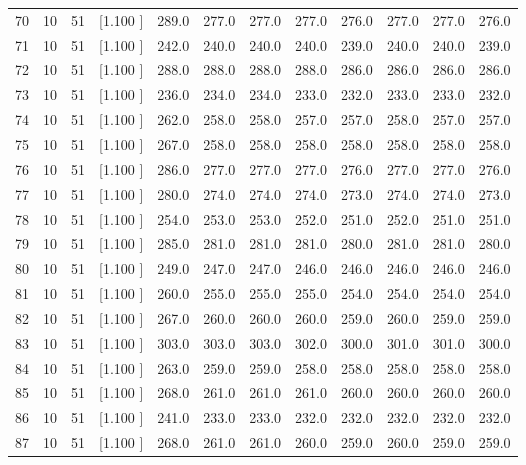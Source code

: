 \documentclass[12pt,a4paper]{article}
\begin{document}
\begin{center}
{\begin{tabular}{r r r r r r r r r r r r}
  70& 10& 51&[1.100     ]&   289.0&   277.0&   277.0&   277.0&   276.0&   277.0&   277.0&   276.0\\[-0.02in]
  71& 10& 51&[1.100     ]&   242.0&   240.0&   240.0&   240.0&   239.0&   240.0&   240.0&   239.0\\[-0.02in]
  72& 10& 51&[1.100     ]&   288.0&   288.0&   288.0&   288.0&   286.0&   286.0&   286.0&   286.0\\[-0.02in]
  73& 10& 51&[1.100     ]&   236.0&   234.0&   234.0&   233.0&   232.0&   233.0&   233.0&   232.0\\[-0.02in]
  74& 10& 51&[1.100     ]&   262.0&   258.0&   258.0&   257.0&   257.0&   258.0&   257.0&   257.0\\[-0.02in]
  75& 10& 51&[1.100     ]&   267.0&   258.0&   258.0&   258.0&   258.0&   258.0&   258.0&   258.0\\[-0.02in]
  76& 10& 51&[1.100     ]&   286.0&   277.0&   277.0&   277.0&   276.0&   277.0&   277.0&   276.0\\[-0.02in]
  77& 10& 51&[1.100     ]&   280.0&   274.0&   274.0&   274.0&   273.0&   274.0&   274.0&   273.0\\[-0.02in]
  78& 10& 51&[1.100     ]&   254.0&   253.0&   253.0&   252.0&   251.0&   252.0&   251.0&   251.0\\[-0.02in]
  79& 10& 51&[1.100     ]&   285.0&   281.0&   281.0&   281.0&   280.0&   281.0&   281.0&   280.0\\[-0.02in]
  80& 10& 51&[1.100     ]&   249.0&   247.0&   247.0&   246.0&   246.0&   246.0&   246.0&   246.0\\[-0.02in]
  81& 10& 51&[1.100     ]&   260.0&   255.0&   255.0&   255.0&   254.0&   254.0&   254.0&   254.0\\[-0.02in]
  82& 10& 51&[1.100     ]&   267.0&   260.0&   260.0&   260.0&   259.0&   260.0&   259.0&   259.0\\[-0.02in]
  83& 10& 51&[1.100     ]&   303.0&   303.0&   303.0&   302.0&   300.0&   301.0&   301.0&   300.0\\[-0.02in]
  84& 10& 51&[1.100     ]&   263.0&   259.0&   259.0&   258.0&   258.0&   258.0&   258.0&   258.0\\[-0.02in]
  85& 10& 51&[1.100     ]&   268.0&   261.0&   261.0&   261.0&   260.0&   260.0&   260.0&   260.0\\[-0.02in]
  86& 10& 51&[1.100     ]&   241.0&   233.0&   233.0&   232.0&   232.0&   232.0&   232.0&   232.0\\[-0.02in]
  87& 10& 51&[1.100     ]&   268.0&   261.0&   261.0&   260.0&   259.0&   260.0&   259.0&   259.0\\[-0.02in]

\end{tabular}}
\end{center}
\end{document}

